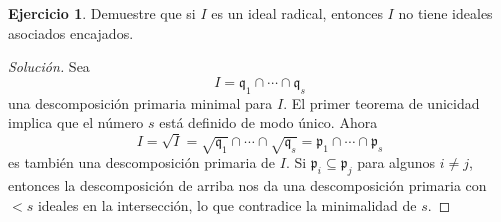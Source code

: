 \documentclass{article}
\theoremstyle{definition}
\newtheorem{ejerc}{Ejercicio}
\newenvironment{solucion}{\begin{proof}[Solución]}{\end{proof}}
\begin{document}
\begin{ejerc}
  Demuestre que si $I$ es un ideal radical, entonces $I$ no tiene ideales
  asociados encajados.

  \ifdefined\solutions\begin{solucion}
    Sea
    $$I = \mathfrak{q}_1 \cap \cdots \cap \mathfrak{q}_s$$
    una descomposición primaria minimal para $I$. El primer teorema de unicidad
    implica que el número $s$ está definido de modo único. Ahora
    \[ I = \sqrt{I} =
       \sqrt{\mathfrak{q}_1} \cap \cdots \cap \sqrt{\mathfrak{q}_s} =
       \mathfrak{p}_1 \cap \cdots \cap \mathfrak{p}_s \]
    es también una descomposición primaria de $I$. Si
    $\mathfrak{p}_i \subseteq \mathfrak{p}_j$ para algunos $i\ne j$, entonces la
    descomposición de arriba nos da una descomposición primaria con $< s$
    ideales en la intersección, lo que contradice la minimalidad de $s$.
  \end{solucion}\fi
\end{ejerc}
\end{document}
